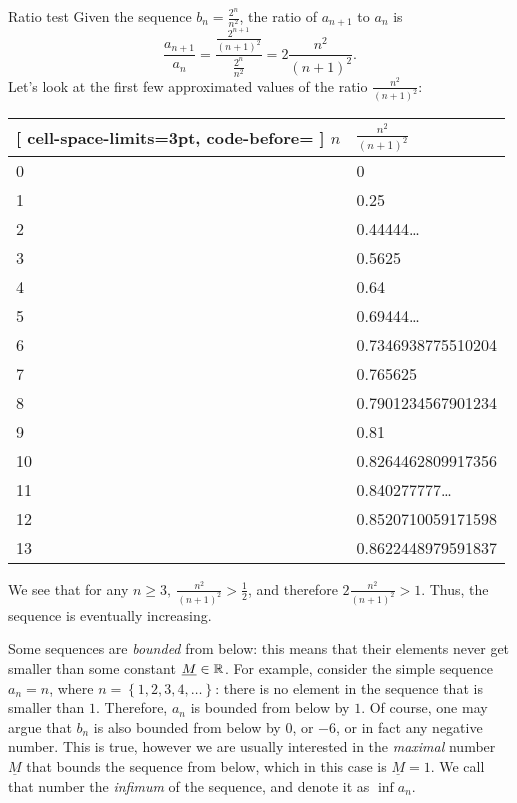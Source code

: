 \begin{example}{Ratio test}{}
	Given the sequence $b_{n}=\frac{2^{n}}{n^{2}}$, the ratio of $a_{n+1}$ to $a_{n}$ is
	\[
		\frac{a_{n+1}}{a_{n}} = \frac{\frac{2^{n+1}}{(n+1)^{2}}}{\frac{2^{n}}{n^{2}}} = 2\frac{n^{2}}{(n+1)^{2}}.
	\]
	Let's look at the first few approximated values of the ratio $\frac{n^{2}}{(n+1)^{2}}$:
	\begin{center}
		\begin{NiceTabular}{p{2mm}l}[
			cell-space-limits=3pt, code-before= 
			]
			\toprule
			\RowStyle{\bfseries} $n$ & $\frac{n^{2}}{(n+1)^{2}}$ \\
			 & 0\\
			1 & 0.25\\
			2 & 0.44444\ldots\\
			3 & 0.5625\\
			4 & 0.64\\
			5 & 0.69444\ldots\\
			6 & 0.7346938775510204\\
			7 & 0.765625\\
			8 & 0.7901234567901234\\
			9 & 0.81\\
			10 & 0.8264462809917356\\
			11 & 0.840277777\ldots\\
			12 & 0.8520710059171598\\
			13 & 0.8622448979591837\\
			\bottomrule
		\end{NiceTabular}
	\end{center}
	We see that for any $n\geq3,\ \frac{n^{2}}{(n+1)^{2}}>\frac{1}{2}$, and therefore $2\frac{n^{2}}{(n+1)^{2}}>1$. Thus, the sequence is eventually increasing.
\end{example}

Some sequences are \emph{bounded} from below: this means that their elements never get smaller than some constant $\underline{M}\in\mathbb{R}^{}$. For example, consider the simple sequence $a_{n}=n$, where $n=\left\{1,2,3,4,\dots\right\}$: there is no element in the sequence that is smaller than $1$. Therefore, $a_{n}$ is bounded from below by $1$. Of course, one may argue that $b_{n}$ is also bounded from below by $0$, or $-6$, or in fact any negative number. This is true, however we are usually interested in the \textit{maximal} number $\underline{M}$ that bounds the sequence from below, which in this case is $\underline{M}=1$. We call that number the \emph{infimum} of the sequence, and denote it as $\inf a_{n}$.

